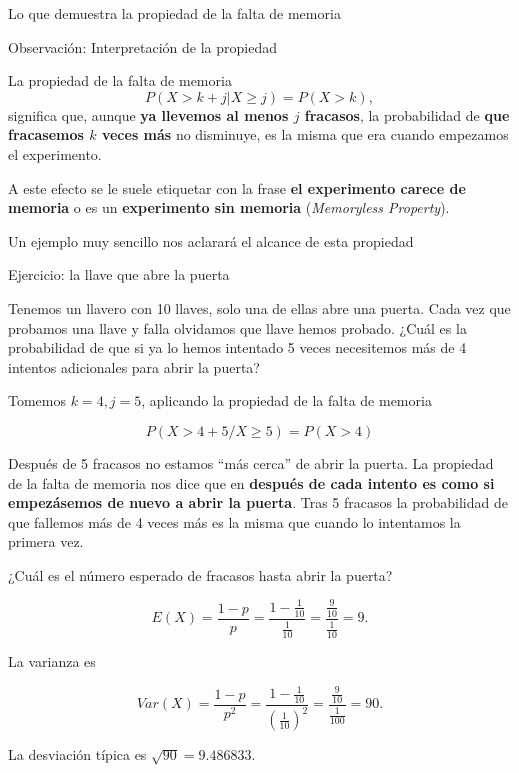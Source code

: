 \documentclass[
  letterpaper,
  DIV=11,
  numbers=noendperiod]{scrreprt}
\begin{document}
Lo que demuestra la propiedad de la falta de memoria

\begin{Advertencia}{Observación: Interpretación de la propiedad}{}

La propiedad de la falta de memoria \[
P(X> k+j\big|X \geq j)=P(X > k),
\] significa que, aunque \textbf{ya llevemos al menos \(j\) fracasos},
la probabilidad de \textbf{que fracasemos \(k\) veces más} no disminuye,
es la misma que era cuando empezamos el experimento.

A este efecto se le suele etiquetar con la frase \textbf{el experimento
carece de memoria} o es un \textbf{experimento sin memoria}
(\emph{Memoryless Property}).

\end{Advertencia}

Un ejemplo muy sencillo nos aclarará el alcance de esta propiedad

\begin{Ejemplo}{Ejercicio: la llave que abre la puerta}{}

Tenemos un llavero con 10 llaves, solo una de ellas abre una puerta.
Cada vez que probamos una llave y falla olvidamos que llave hemos
probado. ¿Cuál es la probabilidad de que si ya lo hemos intentado 5
veces necesitemos más de 4 intentos adicionales para abrir la puerta?

Tomemos \(k=4,j=5\), aplicando la propiedad de la falta de memoria

\[
P(X> 4+5/X \geq 5)=P(X > 4)
\]

Después de 5 fracasos no estamos ``más cerca'' de abrir la puerta. La
propiedad de la falta de memoria nos dice que en \textbf{después de cada
intento es como si empezásemos de nuevo a abrir la puerta}. Tras 5
fracasos la probabilidad de que fallemos más de 4 veces más es la misma
que cuando lo intentamos la primera vez.

¿Cuál es el número esperado de fracasos hasta abrir la puerta?

\[
E(X)=\frac{1-p}{p}=\frac{1-\frac{1}{10}}{\frac{1}{10}}=\frac{\frac{9}{10}}{\frac{1}{10}}=9.
\]

La varianza es

\[
Var(X)=\frac{1-p}{p^2}=\frac{1-\frac{1}{10}}{\left(\frac{1}{10}\right)^2}=\frac{\frac{9}{10}}{\frac{1}{100}}=
90.
\]

La desviación típica es \(\sqrt{90}=9.486833.\)

\end{Ejemplo}
\end{document}
